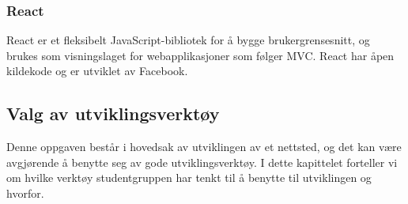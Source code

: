 \subsubsection{React}
React\cite{facebook2019r} er et fleksibelt JavaScript-bibliotek for å bygge brukergrensesnitt, og brukes som visningslaget for webapplikasjoner som følger MVC. React har åpen kildekode og er utviklet av Facebook.

\subsection{Valg av utviklingsverktøy}
Denne oppgaven består i hovedsak av utviklingen av et nettsted, og det kan være avgjørende å benytte seg av gode utviklingsverktøy. I dette kapittelet forteller vi om hvilke verktøy studentgruppen har tenkt til å benytte til utviklingen og hvorfor.

